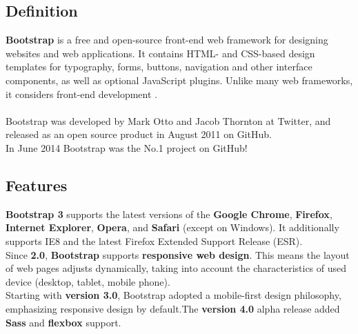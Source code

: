 	\subsection{Definition}
	\textbf{Bootstrap} is a free and open-source front-end web framework for designing websites and web applications. It contains HTML- and CSS-based design templates for typography, forms, buttons, navigation and other interface components, as well as optional JavaScript plugins. Unlike many web frameworks, it considers front-end development \cite{ref9}.
	\\
	\\
	Bootstrap was developed by Mark Otto and Jacob Thornton at Twitter, and released as an open source product in August 2011 on GitHub.\\
	In June 2014 Bootstrap was the No.1 project on GitHub!
	\subsection{Features}
	\textbf{Bootstrap 3} supports the latest versions of the \textbf{Google Chrome}, \textbf{Firefox}, \textbf{Internet Explorer}, \textbf{Opera}, and \textbf{Safari} (except on Windows). It additionally supports IE8 and the latest Firefox Extended Support Release (ESR).
	\\
	Since \textbf{2.0}, \textbf{Bootstrap} supports \textbf{responsive web design}. This means the layout of web pages adjusts dynamically, taking into account the characteristics of used device (desktop, tablet, mobile phone).
	\\
	Starting with \textbf{version 3.0}, Bootstrap adopted a mobile-first design philosophy, emphasizing responsive design by default.The \textbf{version 4.0} alpha release added \textbf{Sass} and \textbf{flexbox} support.
